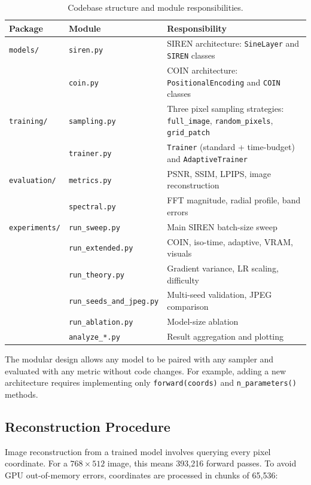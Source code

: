 \documentclass[a4paper,oneside,11pt,english]{scrartcl}
\begin{document}
\begin{table}[H]
\centering
\caption{Codebase structure and module responsibilities.}
\label{tab:codebase}
\begin{tabular}{llp{7cm}}
\toprule
Package & Module & Responsibility \\
\midrule
\texttt{models/} & \texttt{siren.py} & SIREN architecture: \texttt{SineLayer} and \texttt{SIREN} classes \\
& \texttt{coin.py} & COIN architecture: \texttt{PositionalEncoding} and \texttt{COIN} classes \\
\midrule
\texttt{training/} & \texttt{sampling.py} & Three pixel sampling strategies: \texttt{full\_image}, \texttt{random\_pixels}, \texttt{grid\_patch} \\
& \texttt{trainer.py} & \texttt{Trainer} (standard + time-budget) and \texttt{AdaptiveTrainer} \\
\midrule
\texttt{evaluation/} & \texttt{metrics.py} & PSNR, SSIM, LPIPS, image reconstruction \\
& \texttt{spectral.py} & FFT magnitude, radial profile, band errors \\
\midrule
\texttt{experiments/} & \texttt{run\_sweep.py} & Main SIREN batch-size sweep \\
& \texttt{run\_extended.py} & COIN, iso-time, adaptive, VRAM, visuals \\
& \texttt{run\_theory.py} & Gradient variance, LR scaling, difficulty \\
& \texttt{run\_seeds\_and\_jpeg.py} & Multi-seed validation, JPEG comparison \\
& \texttt{run\_ablation.py} & Model-size ablation \\
& \texttt{analyze\_*.py} & Result aggregation and plotting \\
\bottomrule
\end{tabular}
\end{table}

The modular design allows any model to be paired with any sampler and
evaluated with any metric without code changes.  For example, adding a new
architecture requires implementing only \texttt{forward(coords)} and
\texttt{n\_parameters()} methods.

\subsection{Reconstruction Procedure}

Image reconstruction from a trained model involves querying every pixel
coordinate.  For a $768 \times 512$ image, this means 393{,}216 forward
passes.  To avoid GPU out-of-memory errors, coordinates are processed in
chunks of 65{,}536:
\end{document}
